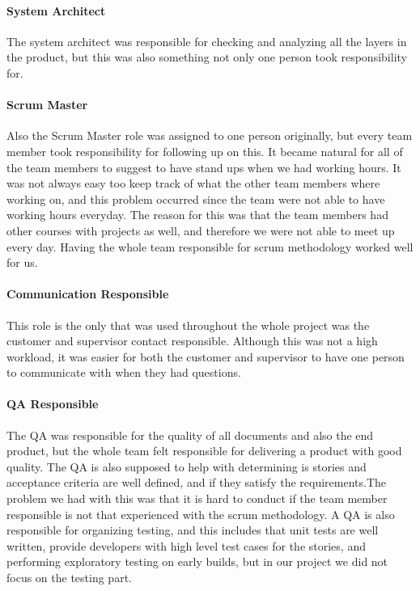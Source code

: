 \paragraph{System Architect}
The system architect was responsible for checking and analyzing all the layers in the product, but this was also something not only one person took responsibility for. 

\paragraph{Scrum Master}
Also the Scrum Master role was assigned to one person originally, but every team member took responsibility for following up on this. It became natural for all of the team members to suggest to have stand ups when we had working hours. It was not always easy too keep track of what the other team members where working on, and this problem occurred since the team were not able to have working hours everyday. The reason for this was that the team members had other courses with projects as well, and therefore we were not able to meet up every day. Having the whole team responsible for scrum methodology worked well for us.

\paragraph{Communication Responsible}
This role is the only that was used throughout the whole project was the customer and supervisor contact responsible. Although this was not a high workload, it was easier for both the customer and supervisor to have one person to communicate with when they had questions.  

\paragraph{QA Responsible}
The QA was responsible for the quality of all documents and also the end product, but the whole team felt responsible for delivering a product with good quality. The QA is also supposed to help with determining is stories and acceptance criteria are well defined, and if they satisfy the requirements.The problem we had with this was that it is hard to conduct if the team member responsible is not that experienced with the scrum methodology. A QA is also responsible for organizing testing, and this includes that unit tests are well written, provide developers with high level test cases for the stories, and performing exploratory testing on early builds, but in our project we did not focus on the testing part. 


